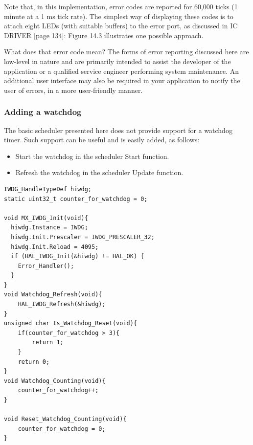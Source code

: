 \documentclass[twoside, final]{hcmut_report}
\begin{document}
Note that, in this implementation, error codes are reported for 60,000 ticks (1
minute at a 1 ms tick rate). 
The simplest way of displaying these codes is to attach eight LEDs (with suitable
buffers) to the error port, as discussed in IC DRIVER [page 134]: Figure 14.3 illustrates
one possible approach.



What does that error code mean?
The forms of error reporting discussed here are low-level in nature and are primarily
intended to assist the developer of the application or a qualified service engineer
performing system maintenance. An additional user interface may also be required
in your application to notify the user of errors, in a more user-friendly manner.
\subsubsection{Adding a watchdog}
The basic scheduler presented here does not provide support for a watchdog timer.
Such support can be useful and is easily added, as follows:
\begin{itemize}
    \item Start the watchdog in the scheduler Start function.
    \item Refresh the watchdog in the scheduler Update function.
\end{itemize}

\begin{lstlisting}[basicstyle=\small, caption=An implementation of the ‘watchdog’ functions]
IWDG_HandleTypeDef hiwdg;
static uint32_t counter_for_watchdog = 0;

void MX_IWDG_Init(void){
  hiwdg.Instance = IWDG;
  hiwdg.Init.Prescaler = IWDG_PRESCALER_32;
  hiwdg.Init.Reload = 4095;
  if (HAL_IWDG_Init(&hiwdg) != HAL_OK) {
    Error_Handler();
  }
}
void Watchdog_Refresh(void){
	HAL_IWDG_Refresh(&hiwdg);
}
unsigned char Is_Watchdog_Reset(void){
	if(counter_for_watchdog > 3){
		return 1;
	}
	return 0;
}
void Watchdog_Counting(void){
	counter_for_watchdog++;
}

void Reset_Watchdog_Counting(void){
	counter_for_watchdog = 0;
}
\end{lstlisting}
\end{document}
